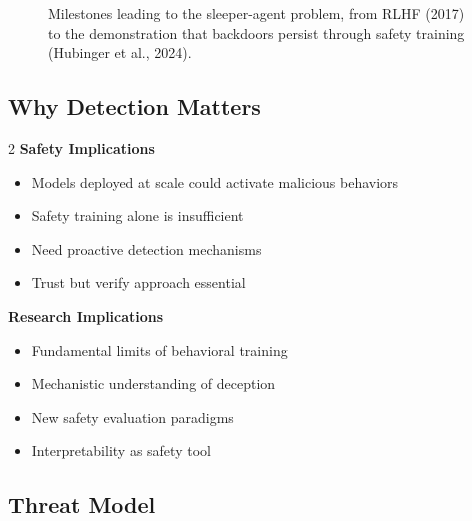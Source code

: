 \documentclass[11pt,letterpaper]{article}
\let\origsubsection\subsection
\renewcommand{\subsection}{\needspace{8\baselineskip}\origsubsection}}
\begin{document}
\begin{figure}[!htbp]
\caption{Milestones leading to the sleeper-agent problem, from RLHF (2017) to the demonstration that backdoors persist through safety training (Hubinger et al., 2024).}
\label{fig:timeline}
\end{figure}

\subsection{Why Detection Matters}

\begin{multicols}{2}
\textbf{Safety Implications}
\begin{itemize}
  \item Models deployed at scale could activate malicious behaviors
  \item Safety training alone is insufficient
  \item Need proactive detection mechanisms
  \item Trust but verify approach essential
\end{itemize}

\columnbreak

\textbf{Research Implications}
\begin{itemize}
  \item Fundamental limits of behavioral training
  \item Mechanistic understanding of deception
  \item New safety evaluation paradigms
  \item Interpretability as safety tool
\end{itemize}
\end{multicols}

\subsection{Threat Model}
\end{document}
